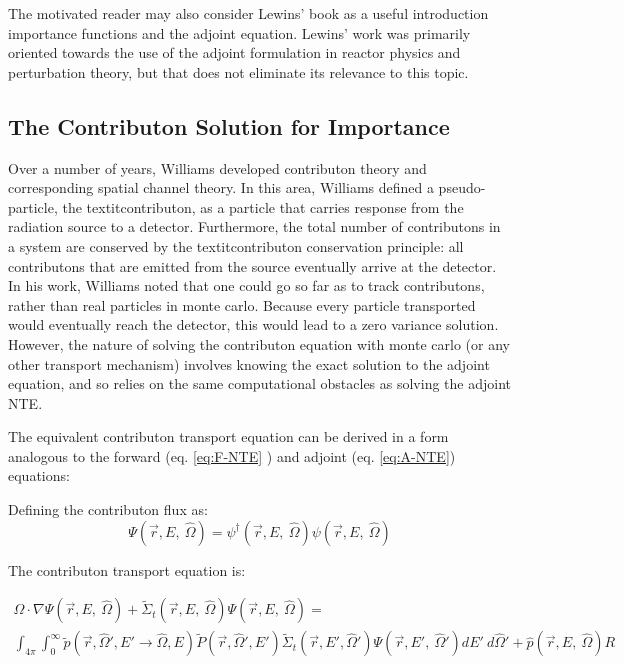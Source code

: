 The motivated reader may also consider Lewins' book
\cite{lewins_importance:_1965} as a
useful introduction importance functions and the adjoint equation. Lewins' work was
primarily oriented towards the use of the adjoint formulation in reactor physics and
perturbation theory, but that does not eliminate its relevance to this topic.


\subsection{The Contributon Solution for Importance}
\label{sec:ContributonImportance}

Over a number of years, Williams
\cite{williams_generalized_1991,williams_contributorn_1992,williams_contributon_study}
developed contributon theory and corresponding spatial channel theory. In this
area, Williams defined a pseudo-particle, the textit{contributon}, as a particle
that carries response from the radiation source to a detector. Furthermore, the
total number of contributons in a system are conserved by the textit{contributon
conservation principle}: all contributons that are emitted from the source
eventually arrive at the detector.  In his work, Williams noted that one could
go so far as to track contributons, rather than real particles in monte carlo.
Because every particle transported would eventually reach the detector, this
would lead to a zero variance solution. However, the nature of solving the
contributon equation with monte carlo (or any other transport mechanism)
involves knowing the exact solution to the adjoint equation, and so relies on
the same computational obstacles as solving the adjoint NTE.

The equivalent contributon transport equation can be derived in a form analogous
to the forward (eq. \ref{eq:F-NTE} ) and adjoint (eq. \ref{eq:A-NTE}) equations:

Defining the contributon flux as:
\begin{equation}
\Psi (\vec {r} ,E,\:\hat\Omega) = \psi^{\dagger} (\vec {r} ,E,\:\hat\Omega)
        \psi(\vec {r} ,E,\:\hat\Omega)
\label{eq.Cont-Flux}
\end{equation}


The contributon transport equation is:

\begin{multline}
\hat\Omega \cdot \nabla \Psi (\vec {r} ,E,\:\hat\Omega)
+\widetilde{\Sigma} _{ t }(\vec{r},E,\:\hat\Omega)\Psi (\vec { r } ,E,\:\hat\Omega)
     = \\
        \int _{ 4\pi  } \int _{ 0 }^{ \infty  }
        \widetilde{p}(\vec{r}, \hat\Omega', E'\rightarrow\hat\Omega, E)
        \widetilde{P}(\vec{r}, \hat\Omega',E')
        \widetilde{\Sigma} _{ t }(\vec{r}, E', \hat\Omega')
        \Psi (\vec { r } ,E',\: \hat\Omega')dE' \:d\hat\Omega'
        + \hat p(\vec { r } ,E, \:\hat\Omega) R
\label{eq:Cont-NTE}
\end{multline}

